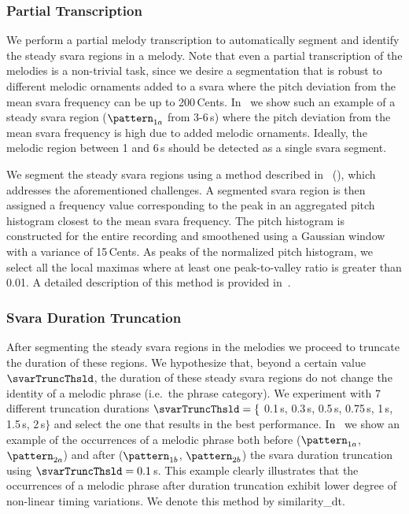 \subsubsection{Partial Transcription}
\label{sec:patterns_improving_similarity_partial_transcription}

We perform a partial melody transcription to automatically segment and identify the steady \gls{svara} regions in a melody. Note that even a partial transcription of the melodies is a non-trivial task, since we desire a segmentation that is robust to different melodic ornaments added to a \gls{svara} where the pitch deviation from the mean \gls{svara} frequency can be up to 200\,Cents. In~ we show such an example of a steady \gls{svara} region ($\pattern_{1a}$ from 3-6\,s) where the pitch deviation from the mean \gls{svara} frequency is high due to added melodic ornaments. Ideally, the melodic region between 1 and 6\,s should be detected as a single \gls{svara} segment.

We segment the steady \gls{svara} regions using a method described in~\cite{gulati2014Landmark} (), which addresses the aforementioned challenges. A segmented \gls{svara} region is then assigned a frequency value corresponding to the peak in an aggregated pitch histogram closest to the mean \gls{svara} frequency. The pitch histogram is constructed for the entire recording and smoothened using a Gaussian window with a variance of 15\,Cents. As peaks of the normalized pitch histogram, we select all the local maximas where at least one peak-to-valley ratio is greater than 0.01. A detailed description of this method is provided in~.
 
\subsubsection{Svara Duration Truncation}
\label{sec:patterns_improving_similarity_svara_duration_trucation}

After segmenting the steady \gls{svara} regions in the melodies we proceed to truncate the duration of these regions. We hypothesize that, beyond a certain value $\svarTruncThsld$, the duration of these steady \gls{svara} regions do not change the identity of a melodic phrase (i.e.~the phrase category). We experiment with 7 different truncation durations $\svarTruncThsld = \lbrace$ 0.1\,s, 0.3\,s, 0.5\,s, 0.75\,s, 1\,s, 1.5\,s, 2\,s$\rbrace$ and select the one that results in the best performance. In~
we show an example of the occurrences of a melodic phrase both before ($\pattern_{1a}$, $\pattern_{2a}$) and after ($\pattern_{1b}$, $\pattern_{2b}$) the \gls{svara} duration truncation using $\svarTruncThsld = 0.1$\,s. This example clearly illustrates that the occurrences of a melodic phrase after duration truncation exhibit lower degree of non-linear timing variations. We denote this method by \acrshort{similarity_dt}.

